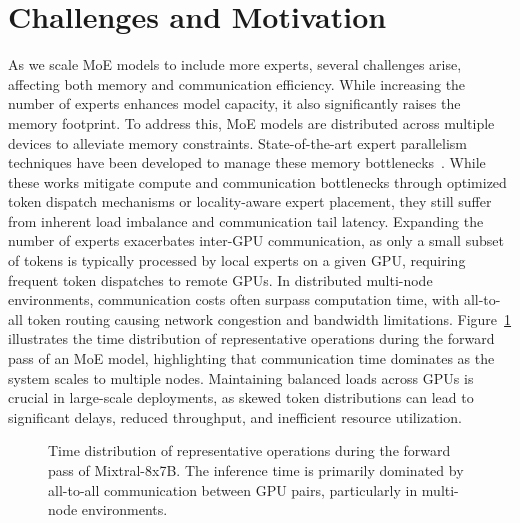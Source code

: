 \section{Challenges and Motivation}

As we scale MoE models to include more experts, several challenges arise, affecting both memory and communication efficiency.
% 
While increasing the number of experts enhances model capacity, it also significantly raises the memory footprint.
% 
To address this, MoE models are distributed across multiple devices to alleviate memory constraints.
% 
State-of-the-art expert parallelism techniques have been developed to manage these memory bottlenecks~\cite{fastermoe,deepspeed-moe,li2023accelerating,exflow}.
% 
%
%
While these works mitigate compute and communication bottlenecks through optimized token dispatch mechanisms or locality-aware expert placement, they still suffer from inherent load imbalance and communication tail latency.
%
Expanding the number of experts exacerbates inter-GPU communication, as only a small subset of tokens is typically processed by local experts on a given GPU, requiring frequent token dispatches to remote GPUs.
% 
In distributed multi-node environments, communication costs often surpass computation time, with all-to-all token routing causing network congestion and bandwidth limitations.
% 
Figure~\ref{fig:time-distribution} illustrates the time distribution of representative operations during the forward pass of an MoE model, highlighting that communication time dominates as the system scales to multiple nodes.
% 
Maintaining balanced loads across GPUs is crucial in large-scale deployments, as skewed token distributions can lead to significant delays, reduced throughput, and inefficient resource utilization.

\begin{figure}
    \centering
    
    \vspace{-2em}
    \caption{Time distribution of representative operations during the forward pass of Mixtral-8x7B. The inference time is primarily dominated by all-to-all communication between GPU pairs, particularly in multi-node environments.}
    \label{fig:time-distribution}
    \vspace{-2ex}
\end{figure}

